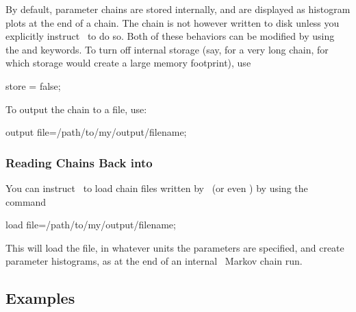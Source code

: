 By default, parameter chains are stored internally, and are displayed
as histogram plots at the end of a chain.  The chain is not however
written to disk unless you explicitly instruct \climax\ to do so.
Both of these behaviors can be modified by using the  and
 keywords.  To turn off internal storage (say, for a very
long chain, for which storage would create a large memory footprint), use

\begin{myindentpar}{3cm}
store = false;
\end{myindentpar}

To output the chain to a file, use:

\begin{myindentpar}{3cm}
output file=/path/to/my/output/filename;
\end{myindentpar}

\subsubsection{Reading Chains Back into \climax}

You can instruct \climaxb\ to load chain files written by \climax\ (or
even \markov) by using the command

\begin{myindentpar}{3cm}
load file=/path/to/my/output/filename;
\end{myindentpar}

This will load the file, in whatever units the parameters are
specified, and create parameter histograms, as at the end of an
internal \climax\ Markov chain run.

\newpage
\subsection{Examples}

